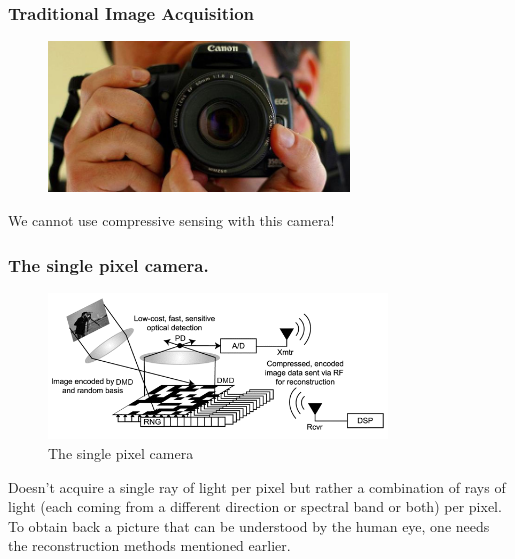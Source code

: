 \documentclass{beamer}
\begin{document}
\begin{frame}
  \frametitle{Traditional Image Acquisition}
  \begin{figure}[h]
    \centering
    \includegraphics[width = 8cm]{camera.jpg}
  \end{figure}
  \begin{center}
We cannot use compressive sensing with this camera!    
  \end{center}

\end{frame}

 \begin{frame}
   \frametitle{The single pixel camera.}
   \begin{figure}[h]
     \centering
     \includegraphics[width = 9cm]{spc}
     \caption{The single pixel camera}
   \end{figure}
 Doesn't acquire a single ray of light per pixel but rather a combination of rays of light (each coming from a different direction or spectral band or both) per pixel. To obtain back a picture that can be understood by the human eye, one needs the reconstruction methods mentioned earlier.
    \end{frame}
\end{document}
